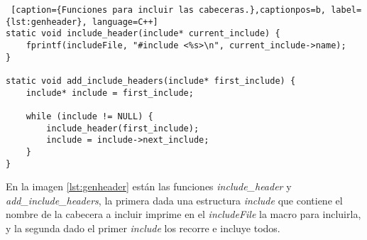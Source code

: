 \begin{lstlisting} [caption={Funciones para incluir las cabeceras.},captionpos=b, label={lst:genheader}, language=C++]
static void include_header(include* current_include) {
	fprintf(includeFile, "#include <%s>\n", current_include->name);
}

static void add_include_headers(include* first_include) {
	include* include = first_include;

	while (include != NULL) {
		include_header(first_include);
		include = include->next_include;
	}
}
\end{lstlisting}

\par\bigskip
En la imagen \ref{lst:genheader} están las funciones \textit{include\_header} y \textit{add\_include\_headers}, la primera dada una estructura \textit{include} que contiene el nombre de la cabecera a incluir imprime en el \textit{includeFile} la macro para incluirla, y la segunda dado el primer \textit{include} los recorre e incluye todos.